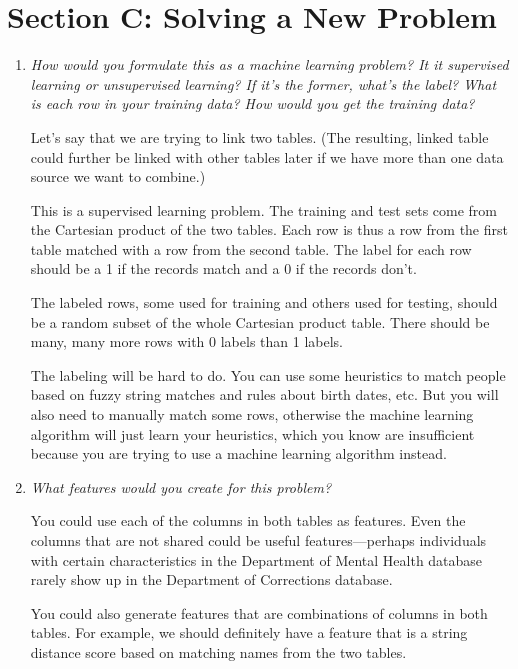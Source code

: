 \documentclass[11pt]{article}
\begin{document}
\section*{Section C: Solving a New Problem}
\begin{enumerate}
    \item \textit{How would you formulate this as a machine learning problem?
        It it supervised learning or unsupervised learning? If it's the former,
        what's the label? What is each row in your training data? How would you
        get the training data?}

        Let's say that we are trying to link two tables. (The resulting, linked
        table could further be linked with other tables later if we have more
        than one data source we want to combine.)

        This is a supervised learning problem. The training and test sets come
        from the Cartesian product of the two tables. Each row is thus a row
        from the first table matched with a row from the second table. The
        label for each row should be a 1 if the records match and a 0 if the
        records don't.

        The labeled rows, some used for training and others used for testing,
        should be a random subset of the whole Cartesian product table. There
        should be many, many more rows with 0 labels than 1 labels.

        The labeling will be hard to do. You can use some heuristics to match
        people based on fuzzy string matches and rules about birth dates, etc.
        But you will also need to manually match some rows, otherwise the
        machine learning algorithm will just learn your heuristics, which you
        know are insufficient because you are trying to use a machine learning
        algorithm instead.

    \item \textit{What features would you create for this problem?}

        You could use each of the columns in both tables as features. Even the
        columns that are not shared could be useful features---perhaps
        individuals with certain characteristics in the Department of Mental
        Health database rarely show up in the Department of Corrections
        database.

        You could also generate features that are combinations of columns in
        both tables. For example, we should definitely have a feature that is a
        string distance score based on matching names from the two tables.


\end{enumerate}
\end{document}
